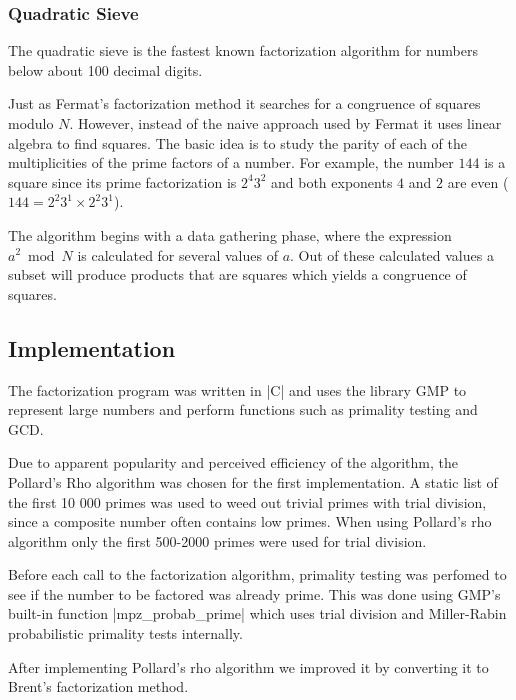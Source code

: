 \documentclass[paper=a4, fontsize=11pt,numbers=endperiod]{scrartcl} %
\numberwithin{equation}{section} %
\numberwithin{figure}{section} %
\numberwithin{table}{section} %
\begin{document}
\subsubsection{Quadratic Sieve}
The quadratic sieve \cite{qsieve} is the fastest known factorization algorithm for numbers below about 100 decimal digits\cite{qsieve2}. 

Just as Fermat's factorization method it searches for a congruence of squares modulo $N$. However, instead of the naive approach used by Fermat it uses linear algebra to find squares. The basic idea is to study the parity of each of the multiplicities of the prime factors of a number. For example, the number $144$ is a square since its prime factorization is $2^{4}3^2$ and both exponents $4$ and $2$ are even ($144 = 2^2 3^1\times2^2 3^1$).

The algorithm begins with a data gathering phase, where the expression $a^2 \bmod N$ is calculated for several values of $a$.
Out of these calculated values a subset will produce products that are squares which yields a congruence of squares.

\subsection{Implementation}
The factorization program was written in |C| and uses the library GMP \cite{gmp} to represent large numbers and perform functions such as primality testing and GCD.

Due to apparent popularity and perceived efficiency of the algorithm, the Pollard's Rho algorithm was chosen for the first implementation.
A static list of the first 10 000 primes was used to weed out trivial primes with trial division, since a composite number often contains low primes. 
When using Pollard's rho algorithm only the first 500-2000 primes were used for trial division.

Before each call to the factorization algorithm, primality testing was perfomed to see if the number to be factored was already prime. This was done using GMP's built-in function |mpz_probab_prime| which uses trial division and Miller-Rabin probabilistic primality tests internally. \cite{probabprime}


After implementing Pollard's rho algorithm we improved it by converting it to Brent's factorization method.
\end{document}
